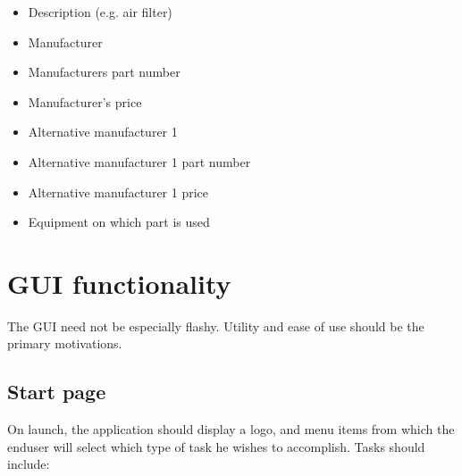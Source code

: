 \documentclass[titlepage]{article}
\begin{document}
            \begin{itemize}
                \item
                Description (e.g. air filter)
                
                \item
                Manufacturer
                
                \item
                Manufacturers part number
                
                \item
                Manufacturer's price
                
                \item
                Alternative manufacturer 1
                
                \item
                Alternative manufacturer 1 part number
                
                \item
                Alternative manufacturer 1 price
                
                \item
                Equipment on which part is used
            \end{itemize}
            
    \section{GUI functionality}
        The GUI need not be especially flashy. Utility and ease of use should be the primary
        motivations.
        
        \subsection{Start page}
            On launch, the application should display a logo, and menu items from which the
            enduser will select which type of task he wishes to accomplish. Tasks should include:
            
\end{document}
